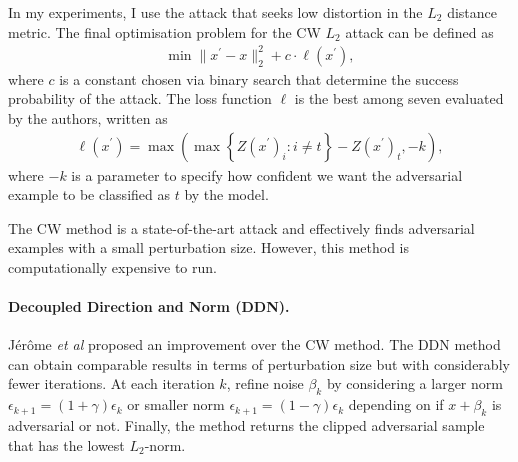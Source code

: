 In my experiments, I use the attack that seeks low distortion in the $L_{2}$
distance metric. The final optimisation problem for the CW $L_{2}$ attack can be
defined as
\begin{align} \label{eq:cw_min}
    \min{\lVert x^{\prime}-x\lVert_{2}^{2}+c\cdot\ell(x^{\prime})},
\end{align}
where $c$ is a constant chosen via binary search that determine the success
probability of the attack. The loss function $\ell$ is the best among seven
evaluated by the authors, written as
\begin{align} \label{eq:cw_lf}
    \ell(x^{\prime})=\max{\left(\max{\left\{ Z(x^{\prime})_{i}:i\neq t\right\} }-Z(x^{\prime})_{t},-k\right)},
\end{align}
where $-k$ is a parameter to specify how confident we want the adversarial
example to be classified as $t$ by the model.

The CW method is a state-of-the-art attack and effectively finds adversarial
examples with a small perturbation size. However, this method is computationally
expensive to run.

\paragraph{Decoupled Direction and Norm (DDN).}
Jérôme \emph{et al} \cite{rony_decoupling_2019} proposed an improvement over the
CW method. The DDN method can obtain comparable results in terms of perturbation
size but with considerably fewer iterations. At each iteration $k$, refine noise
$\beta_{k}$ by considering a larger norm $\epsilon_{k+1}=(1+\gamma)\epsilon_{k}$
or smaller norm $\epsilon_{k+1}=(1-\gamma)\epsilon_{k}$ depending on if
$x+\beta_{k}$ is adversarial or not. Finally, the method returns the clipped
adversarial sample that has the lowest $L_{2}$-norm.

